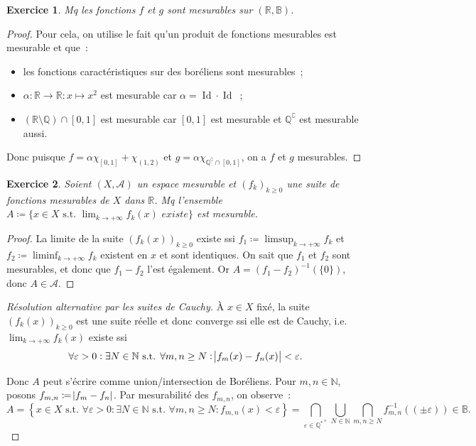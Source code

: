 \documentclass{article}
\newtheorem{ex}{Exercice}[section]
\newcommand{\pinfty}{{+\infty}}
\newcommand{\st}{\text{ s.t. }}
\newcommand{\C}{\complement}
\newcommand{\N}{{\mathbb N}}
\newcommand{\Q}{{\mathbb Q}}
\newcommand{\R}{{\mathbb R}}
\newcommand{\B}{{\mathbb B}}
\DeclareMathOperator{\Id}{Id}
\begin{document}
\begin{ex} Mq les fonctions $f$ et $g$ sont mesurables sur $(\R, \B)$.
\end{ex}

\begin{proof} Pour cela, on utilise le fait qu'un produit de fonctions mesurables est mesurable et que~:
\begin{itemize}
	\item les fonctions caractéristiques sur des boréliens sont mesurables~;
	\item $\alpha : \R \to \R : x \mapsto x^2$ est mesurable car $\alpha = \Id \cdot \Id$~;
	\item $(\R \setminus \Q) \cap [0, 1]$ est mesurable car $[0, 1]$ est mesurable et $\Q^\C$ est mesurable aussi.
\end{itemize}

Donc puisque $f = \alpha\chi_{[0, 1]} + \chi_{(1, 2)}$ et $g = \alpha\chi_{\Q^\C \cap [0, 1]}$, on a $f$ et $g$ mesurables.
\end{proof}

\begin{ex} Soient $(X, \mathcal A)$ un espace mesurable et $(f_k)_{k \geq 0}$ une suite de fonctions mesurables de $X$ dans $\R$. Mq
l'ensemble $A \coloneqq \{x \in X \st \lim_{k \to \pinfty}f_k(x) \textit{ existe}\}$ est mesurable.
\end{ex}

\begin{proof} La limite de la suite $(f_k(x))_{k \geq 0}$ existe ssi $f_1 \coloneqq \limsup_{k \to \pinfty}f_k$ et $f_2 \coloneqq \liminf_{k \to \pinfty}f_k$ existent en $x$
et sont identiques. On sait que $f_1$ et $f_2$ sont mesurables, et donc que $f_1 - f_2$ l'est également. Or $A = (f_1-f_2)^{-1}(\{0\})$, donc $A \in \mathcal A$.
\end{proof}

\begin{proof}[Résolution alternative par les suites de Cauchy] À $x \in X$ fixé, la suite $(f_k(x))_{k \geq 0}$ est une suite réelle et donc converge ssi elle est de Cauchy,
i.e. $\lim_{k \to \pinfty}f_k(x)$ existe ssi
\[\forall \varepsilon > 0 : \exists N \in \N \st \forall m, n \geq N : \abs {f_m(x) - f_n(x)} < \varepsilon.\]

Donc $A$ peut s'écrire comme union/intersection de Boréliens. Pour $m, n \in \N$, posons $f_{m,n} \coloneqq \abs {f_m-f_n}$. Par mesurabilité des $f_{m,n}$, on observe~:
\[A = \left\{x \in X \st \forall \varepsilon > 0 : \exists N \in \N \st \forall m, n \geq N : f_{m,n}(x) < \varepsilon\right\}
	= \bigcap_{\varepsilon \in {\Q^*}^+}\bigcup_{N \in \N}\bigcap_{m,n \geq N}f_{m,n}^{-1}((\pm \varepsilon)) \in \B.\]
\end{proof}
\end{document}
